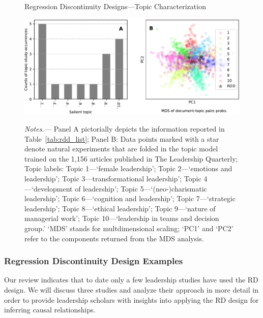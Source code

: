 \documentclass[english]{article}
\begin{document}
\begin{figure}[] 
	\centering
	\caption{Regression Discontinuity Designs---Topic Characterization}
	\includegraphics[width=1\textwidth]{_3}
	\label{fig:mds_rdd}
	\caption*{\small\textit{Notes.---} Panel A pictorially depicts the
		information reported in Table~\ref{tab:rdd_list}; Panel B: Data points
		marked with a star denote natural experiments that are folded
		in the topic model trained on the 1,156 articles published in The
		Leadership Quarterly; Topic labels: Topic 1---`female
		leadership'; Topic 2---`emotions and leadership';
		Topic 3---transformational leadership'; Topic 4---`development
		of leadership'; Topic 5---`(neo-)charismatic leadership'; Topic
		6---`cognition and leadership'; Topic 7---`strategic
		leadership'; Topic 8---`ethical leadership'; Topic 9---`nature
		of managerial work'; Topic 10---`leadership
		in teams and decision group.' `MDS' stands for
		multdimensional scaling; `PC1' and `PC2' refer to the
components returned from the MDS analysis.}
\end{figure}


\subsubsection{Regression Discontinuity Design Examples} 

\noindent Our review indicates that to date only a few leadership studies have
used the RD design. We will discuss three studies and analyze their
approach in more detail in order to provide leadership scholars with
insights into applying the RD design for inferring causal relationships.
\end{document}
